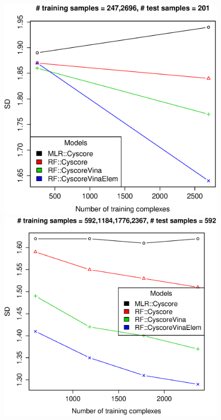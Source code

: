 \documentclass[journal=jacsat,manuscript=article]{achemso}
\begin{document}
\begin{figure}[ht!]
\includegraphics[width=\linewidth]{../rfcyscore/tst-201-sdev.eps}
\endminipage
{}
\includegraphics[width=\linewidth]{../rfcyscore/tst-592-sdev.eps}
\endminipage
\\

\end{figure}
\end{document}
